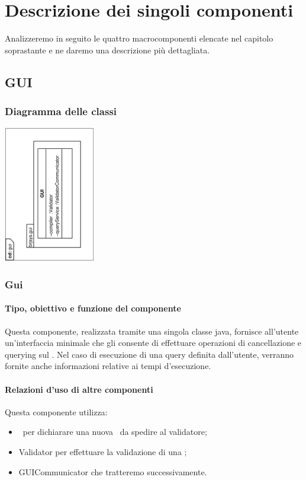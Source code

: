 \documentclass[11pt,titlepage,a4paper]{report}
\begin{document}
\chapter{Descrizione dei singoli componenti}
Analizzeremo in seguito le quattro macrocomponenti elencate nel capitolo soprastante e ne daremo una descrizione pi\`u dettagliata.

\section{GUI}
\subsection{Diagramma delle classi}
\begin{center}
\includegraphics[width=0.3\textwidth, angle=-90]{DiagrammaClassi/gui.eps}
\end{center}
\subsection{Gui}
\subsubsection{Tipo, obiettivo e funzione del componente}
Questa componente, realizzata tramite una singola classe java, fornisce all'utente un'interfaccia minimale che gli consente di effettuare operazioni di cancellazione e querying sul \re. Nel caso di esecuzione di una query definita dall'utente, verranno fornite anche informazioni relative ai tempi d'esecuzione.
\subsubsection{Relazioni d'uso di altre componenti}
Questa componente utilizza:
\begin{itemize}
 \item \BR\ per dichiarare una nuova \br\ da spedire al validatore;
 \item Validator per effettuare la validazione di una \br;
 \item GUICommunicator che tratteremo successivamente.
\end{itemize}
\end{document}
